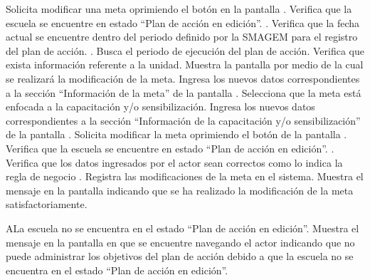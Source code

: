  
\begin{UCtrayectoria}
	\UCpaso[\UCactor] Solicita modificar una meta oprimiendo el botón \botEdit en la pantalla .
	\UCpaso[\UCsist] Verifica que la escuela se encuentre en  estado ``Plan de acción en edición''. .
    \UCpaso[\UCsist] Verifica que la fecha actual se encuentre dentro del periodo definido por la SMAGEM para el registro del plan de acción. .	
	\UCpaso[\UCsist] Busca el periodo de ejecución del plan de acción.
	\UCpaso[\UCsist] Verifica que exista información referente a la unidad. 
	\UCpaso[\UCsist] Muestra la pantalla  por medio de la cual se realizará la modificación de la meta.
	\UCpaso[\UCactor] Ingresa los nuevos datos correspondientes a la sección ``Información de la meta'' de la pantalla . \label{cupl2:ingresaDatos}
	\UCpaso[\UCactor] Selecciona que la meta está enfocada a la capacitación y/o sensibilización. 
	\UCpaso[\UCactor] Ingresa los nuevos datos correspondientes a la sección ``Información de la capacitación y/o sensibilización'' de la pantalla .
	\UCpaso[\UCactor] Solicita modificar la meta oprimiendo el botón  de la pantalla .  \label{cupl2:oprimeAceptar}
	\UCpaso[\UCsist] Verifica que la escuela se encuentre en  estado ``Plan de acción en edición''. .	
	\UCpaso[\UCsist] Verifica que los datos ingresados por el actor sean correctos como lo indica la regla de negocio .   
	\UCpaso[\UCsist] Registra las modificaciones de la meta en el sistema.
	\UCpaso[\UCsist] Muestra el mensaje  en la pantalla  indicando que se ha realizado la modificación de la meta satisfactoriamente.
\end{UCtrayectoria}
 
\begin{UCtrayectoriaA}{A}{La escuela no se encuentra en el estado ``Plan de acción en edición''.}
    \UCpaso[\UCsist] Muestra el mensaje  en la pantalla en que se encuentre navegando el actor indicando que no puede administrar los objetivos del plan de acción debido a que la escuela no se encuentra en el estado ``Plan de acción en edición''. 
 \end{UCtrayectoriaA}
 
